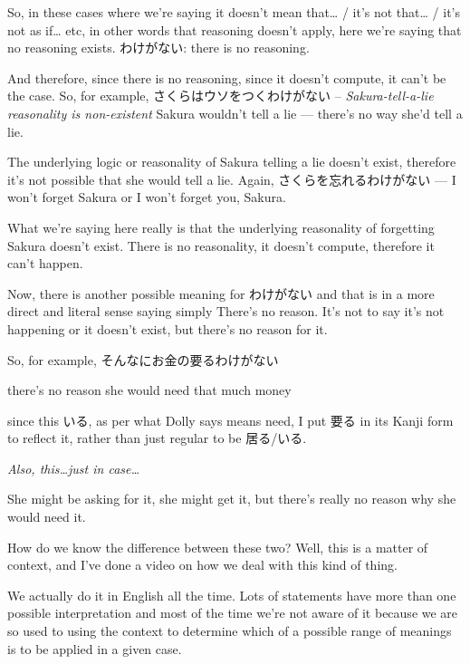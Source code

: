 So, in these cases where we're saying it doesn't mean that\ldots{} / it's not that\ldots{} / it's not as if\ldots{} etc, in other words that reasoning doesn't apply, here we're saying that no reasoning exists. わけがない: there is no reasoning.

And therefore, since there is no reasoning, since it doesn't compute, it can't be the case. So, for example, さくらはウソをつくわけがない -- {\em Sakura-tell-a-lie reasonality is non-existent} Sakura wouldn't tell a lie --- there's no way she'd tell a lie.

{}

The underlying logic or reasonality of Sakura telling a lie doesn't exist, therefore it's not possible that she would tell a lie. Again, さくらを忘れるわけがない --- I won't forget Sakura or I won't forget you, Sakura.

What we're saying here really is that the underlying reasonality of forgetting Sakura doesn't exist. There is no reasonality, it doesn't compute, therefore it can't happen.

\startsectionlevel[title={わけがない as there is no reason},reference={わけがない-as-there-is-no-reason}]

Now, there is another possible meaning for わけがない and that is in a more direct and literal sense saying simply There's no reason. It's not to say it's not happening or it doesn't exist, but there's no reason for it.

\thinrule

So, for example, そんなにお金の要るわけがない

{}

there's no reason she would need that much money

since this いる, as per what Dolly says means need, I put 要る in its Kanji form to reflect it, rather than just regular to be 居る/いる.

{\em Also, this\ldots{}just in case\ldots{} }{}

She might be asking for it, she might get it, but there's really no reason why she would need it.

How do we know the difference between these two? Well, this is a matter of context, and I've done a video on how we deal with this kind of thing.

We actually do it in English all the time. Lots of statements have more than one possible interpretation and most of the time we're not aware of it because we are so used to using the context to determine which of a possible range of meanings is to be applied in a given case.

